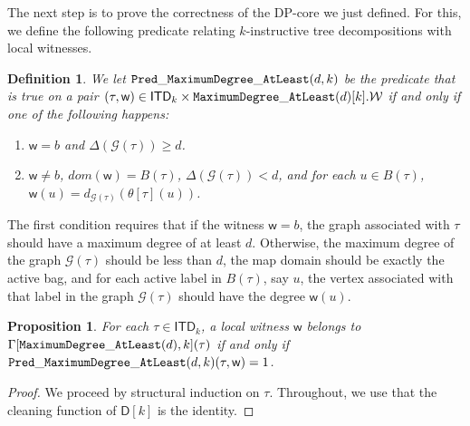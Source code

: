 \documentclass[11pt,a4paper]{article}
\newtheorem{definition}[theorem]{Definition}
\newtheorem{proposition}[theorem]{Proposition}
\newcommand{\truevalue}{1}
\newcommand{\treewidthvalue}{k}
\newcommand{\decompositiongraph}[1]{\mathcal{G}(#1)}
\newcommand{\maxDegree}{\Delta}
\newcommand{\topbagname}{B}
\newcommand{\topbag}[1]{\topbagname(#1)}
\newcommand{\allabstractdecompositionstreewidth}[1]{\mathsf{ITD}_{#1}}
\newcommand{\abstractdecomposition}{\tau}
\newcommand{\vertexone}{u}
\newcommand{\allwitnesses}{\mathcal{W}}
\newcommand{\awitness}{\mathsf{w}}
\newcommand{\dpcore}{\mathsf{D}}
\newcommand{\dpNamePart}[1]{\mbox{\normalfont\ttfamily #1}}
\newcommand{\maxDegreeAtLeastCore}[1]{\dpNamePart{MaximumDegree}\_\allowbreak\dpNamePart{AtLeast}(#1)}
\newcommand{\predicateMaxDegree}[2]{\dpNamePart{Pred}\_\allowbreak\dpNamePart{MaximumDegree}\_\allowbreak\dpNamePart{AtLeast}(#1,#2)}
\newcommand{\topmapname}{\theta}
\newcommand{\topmap}[1]{\topmapname[#1]}
\newcommand{\dynamizationfunctionname}[1]{\Gamma[{#1}]}
\newcommand{\dynamizationfunction}[2]{\dynamizationfunctionname{#1,#2}}
\newcommand{\domain}{dom}
\newcommand{\maxdegreeparameter}{d}
\newcommand{\maxdegreefound}{b}
\newcommand{\mxdp}{\predicateMaxDegree{\maxdegreeparameter}{\treewidthvalue}}
\begin{document}
{The next step is to prove the correctness of the DP-core we just defined. For this, we define the following predicate relating $\treewidthvalue$-instructive tree decompositions with local witnesses.

\begin{definition}
\label{definition:MaxDegreePredicate}
We let $\mxdp$ be the predicate that is true on a pair $(\abstractdecomposition,\awitness)   \in \allabstractdecompositionstreewidth{\treewidthvalue}\times \maxDegreeAtLeastCore{\maxdegreeparameter}[\treewidthvalue].\allwitnesses$ if and only if one of the following happens:
\begin{enumerate}
    \item \label{definition:MaxDegreePredicate-one} $\awitness = \maxdegreefound$ and $\maxDegree(\decompositiongraph{\abstractdecomposition})\geq \maxdegreeparameter$.
    \item $\awitness\neq \maxdegreefound$, $\domain(\awitness)=\topbag{\abstractdecomposition}$, $\maxDegree(\decompositiongraph{\abstractdecomposition})< \maxdegreeparameter$, and for each $\vertexone  \in \topbag{\abstractdecomposition}$, $\awitness(\vertexone) = d_{\decompositiongraph{\abstractdecomposition}}(\topmap{\abstractdecomposition}(\vertexone))$.
\end{enumerate}
\end{definition}


The first condition requires that if the witness $\awitness = \maxdegreefound$, the graph associated with $\abstractdecomposition$ should have a maximum degree of at least $\maxdegreeparameter$. Otherwise, the maximum degree of the graph $\decompositiongraph{\abstractdecomposition}$ should be less than $\maxdegreeparameter$, the map domain should be exactly the active bag, and for each active label in $\topbag{\abstractdecomposition}$, say $\vertexone$, the vertex associated with that label in the graph $\decompositiongraph{\abstractdecomposition}$ should have the degree $\awitness(\vertexone)$.

\begin{proposition}
\label{proposition:PredicateMaxDegree}
For each $\abstractdecomposition  \in \allabstractdecompositionstreewidth{\treewidthvalue}$, a local witness $\awitness$ belongs to
$
\dynamizationfunction{\maxDegreeAtLeastCore{\maxdegreeparameter}}{\treewidthvalue}(\abstractdecomposition)
$
if and only if $\mxdp(\abstractdecomposition,\awitness)=\truevalue$.
\end{proposition}

\begin{proof}
We proceed by structural induction on $\abstractdecomposition$. Throughout, we use that the cleaning function of $\dpcore[\treewidthvalue]$ is the identity.


\end{proof}}
\end{document}
